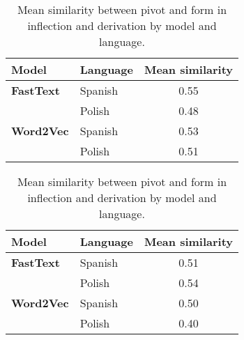 \documentclass[12pt]{article}
\begin{document}
\begin{table}[h!]
\centering
\label{tbl:mean-similarity}
\begin{minipage}[t]{0.48\textwidth}
\footnotesize
\centering
{}
\begin{tabular}{llc}
\toprule
\textbf{Model} & \textbf{Language} & \textbf{Mean similarity} \\
\midrule
\textbf{FastText}  & Spanish & 0.55 \\
                   & Polish  & 0.48 \\
\textbf{Word2Vec}  & Spanish & 0.53 \\
                   & Polish  & 0.51 \\
\bottomrule
\end{tabular}
\end{minipage}
\hfill
\begin{minipage}[t]{0.48\textwidth}
\footnotesize
\centering
{}
\begin{tabular}{llc}
\toprule
\textbf{Model} & \textbf{Language} & \textbf{Mean similarity} \\
\midrule
\textbf{FastText}  & Spanish & 0.51 \\
                   & Polish  & 0.54 \\
\textbf{Word2Vec}  & Spanish & 0.50 \\
                   & Polish  & 0.40 \\
\bottomrule
\end{tabular}
\end{minipage}
\caption{Mean similarity between pivot and form in inflection and derivation by model and language.}
\end{table}





\newpage
{}
\sloppy
\printbibliography
\end{document}
